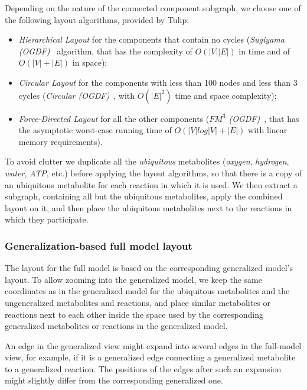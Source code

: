 \documentclass{bmcart}
\begin{document}
Depending on the nature of the connected component subgraph, we choose one of the following layout algorithms, provided by Tulip:
\begin{itemize}
\item \emph{Hierarchical Layout} for the components that contain no cycles (\emph{Sugiyama (OGDF)}~\cite{Sugiyama1981} algorithm, that has the complexity of $O(|V||E|)$ in time and of $O(|V| + |E|)$ in space);
\item \emph{Circular Layout} for the components with less than 100 nodes and less than 3 cycles (\emph{Circular (OGDF)}~\cite{Tamassia:2007:HGD:1202383}, with $O(|E|^2)$ time and space complexity);
\item \emph{Force-Directed Layout} for all the other components (\emph{$FM^3$ (OGDF)}~\cite{Hachul2005}, that has the asymptotic worst-case running time of $O(|V|log|V|+|E|)$ with linear memory requirements).
\end{itemize}

To avoid clutter we duplicate all the \emph{ubiquitous} metabolites (\textit{oxygen}, \textit{hydrogen}, \textit{water}, \textit{ATP}, etc.) before applying the layout algorithms, so that there is a copy of an ubiquitous metabolite for each reaction in which it is used. We then extract a subgraph, containing all but the ubiquitous metabolites, apply the combined layout on it, and then place the ubiquitous metabolites next to the reactions in which they participate. 

\subsubsection*{Generalization-based full model layout}
The layout for the full model is based on the corresponding generalized model's layout. To allow zooming into the generalized model, we keep the same coordinates as in the generalized model for the ubiquitous metabolites and the ungeneralized metabolites and reactions, and place similar metabolites or reactions next to each other inside the space used by the corresponding generalized metabolites or reactions in the generalized model. 

An edge in the generalized view might expand into several edges in the full-model view, for example, if it is a generalized edge connecting a generalized metabolite to a generalized reaction. The positions of the edges after such an expansion might slightly differ from the corresponding generalized one.
\end{document}
